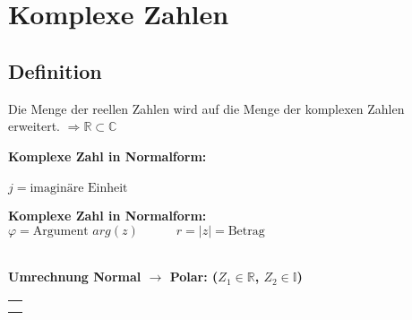 \section{Komplexe Zahlen}
	\subsection{Definition}
		Die Menge der reellen Zahlen wird auf die Menge der komplexen Zahlen erweitert. $\Rightarrow \mathbb{R} \subset \mathbb{C}$\\
		
		\begin{minipage}[t]{0.5\textwidth}
			\textbf{Komplexe Zahl in Normalform:}\\[3pt]
			\\
			$j = \text{imaginäre Einheit}$
		\end{minipage}
		\begin{minipage}[t]{0.5\textwidth}
			\textbf{Komplexe Zahl in Normalform:}\\[3pt]
			$\varphi = \text{Argument } arg(z) \quad\qquad r = \left| z \right| = \text{Betrag}$
		\end{minipage}\\[3pt]
		\textbf{Umrechnung Normal $\rightarrow$ Polar: ($Z_1 \in \mathbb{R}$, $Z_2 \in \mathbb{I}$)}\\
		\begin{tabular}{l}
			\fbox{$|z| = r = \sqrt{z_{1}^2 + z_{2}^2}$}\\[6pt]
			\fbox{$|z| = r = \sqrt{z \cdot \overline{z}}$}\\[6pt]
		\end{tabular}
		\\[3pt]
